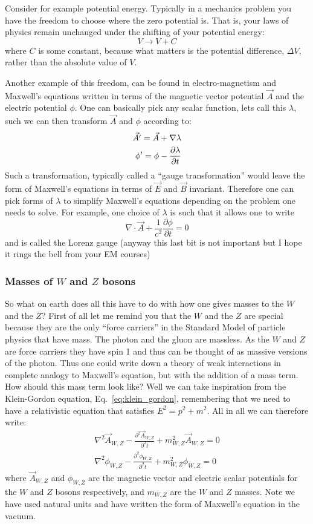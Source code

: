 Consider for example potential energy. Typically in a mechanics problem you have the freedom to choose where the zero potential is. That is, your laws of physics remain unchanged under the shifting of your potential energy:\[V\to V+C\] where $C$ is some constant, because what matters is the potential difference, $\Delta V$, rather than the absolute value of $V$.

Another example of this freedom, can be found in electro-magnetism and Maxwell's equations written in terms of the magnetic vector potential $\vec{A}$ and the electric potential $\phi$. One can basically pick any scalar function, lets call this $\lambda$, such we can then transform $\vec{A}$ and $\phi$ according to:
\begin{eqnarray}
\label{eq:gauge_transformation}
\vec{A'}=\vec{A}+\nabla\lambda\\
\phi'=\phi-\frac{\partial\lambda}{\partial t}\notag
\end{eqnarray}
Such a transformation, typically called a ``gauge transformation'' would leave the form of Maxwell's equations in terms of $\vec{E}$ and $\vec{B}$ invariant. Therefore one can pick forms of $\lambda$ to simplify Maxwell's equations depending on the problem one needs to solve. For example, one choice of $\lambda$ is such that it allows one to write
\[
\nabla\cdot\vec{A}+\frac{1}{c^2}\frac{\partial\phi}{\partial t}=0
\]
and is called the Lorenz gauge (anyway this last bit is not important but I hope it rings the bell from your EM courses)

\subsubsection{Masses of $W$ and $Z$ bosons}
So what on earth does all this have to do with how one gives masses to the $W$ and the $Z$? First of all let me remind you that the $W$ and the $Z$ are special because they are the only ``force carriers'' in the Standard Model of particle physics that have mass. The photon and the gluon are massless. As the $W$ and $Z$ are force carriers they have spin 1 and thus can be thought of as massive versions of the photon. Thus one could write down a theory of weak interactions in complete analogy to Maxwell's equation, but with the addition of a mass term. How should this mass term look like? Well we can take inspiration from the Klein-Gordon equation, Eq.~\ref{eq:klein_gordon}, remembering that we need to have a relativistic equation that satisfies $E^2=p^2+m^2$. All in all we can therefore write:
\begin{eqnarray}
\nabla^{2}\vec{A}_{W,Z}-\frac{\partial^2\vec{A}_{W,Z}}{\partial^2t}+m_{W,Z}^2\vec{A}_{W,Z}=0\\
\nabla^{2}\phi_{W,Z}-\frac{\partial^2\phi_{W,Z}}{\partial^2t}+m_{W,Z}^2 \phi_{W,Z}=0
\end{eqnarray}
where $\vec{A}_{W,Z}$ and $\phi_{W,Z}$ are the magnetic vector and electric scalar potentials for the $W$ and $Z$ bosons respectively, and $m_{W,Z}$ are the $W$ and $Z$ masses.
Note we have used natural units and have written the form of Maxwell's equation in the vacuum. 

